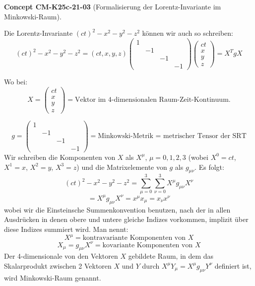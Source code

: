 \documentclass[10pt, letterpaper]{article}
\newcommand{\CustomHeading}[3]{%
  \par\medskip\noindent%
  \textbf{#1 #2} \textnormal{(#3)}.\enskip%
}
\newenvironment{CONC}[2]{\CustomHeading{Concept}{#1}{#2}}{}
\begin{document}
\begin{CONC}{CM-K25c-21-03}{Formalisierung der Lorentz-Invariante im Minkowski-Raum}
Die Lorentz-Invariante $(ct)^2-x^2-y^2-z^2$ können wir auch so schreiben:
\[(ct)^2-x^2-y^2-z^2 = (ct,x,y,z)\begin{pmatrix} 1 & & & \\ & -1 & & \\  & & -1 & \\ & & & -1 \end{pmatrix}\begin{pmatrix} ct \\ x \\ y \\ z\end{pmatrix} = X^T g X\]

Wo bei:
\[X = \begin{pmatrix} ct \\ x \\ y \\ z\end{pmatrix} = \text{Vektor im 4-dimensionalen Raum-Zeit-Kontinuum.}\]

\[g = \begin{pmatrix} 1 & & & \\ & -1 & & \\  & & -1 & \\ & & & -1 \end{pmatrix} = \text{Minkowski-Metrik = metrischer Tensor der SRT}\]
Wir schreiben die Komponenten von $X$ als $X^\mu$, $\mu=0,1,2,3$ (wobei $X^0=ct$, $X^1=x$, $X^2=y$, $X^3=z$) und die Matrixelemente von $g$ als $g_{\mu\nu}$. Es folgt:
\[(ct)^2-x^2-y^2-z^2 = \sum_{\mu=0}^3 \sum_{\nu=0}^3 X^\mu g_{\mu\nu} X^\nu\]
\[= X^\mu g_{\mu\nu} X^\nu = x^\mu x_\mu=x_\nu x^\nu\]
wobei wir die Einsteinsche Summenkonvention benutzen, nach der in allen Ausdrücken in denen obere und untere gleiche Indizes vorkommen, implizit über diese Indizes summiert wird.
Man nennt:
\[ X^\mu = \text{kontravariante Komponenten von } X \]
\[ X_\mu = g_{\mu\nu}X^\nu = \text{kovariante Komponenten von } X \]
Der 4-dimensionale von den Vektoren $X$ gebildete Raum, in dem das Skalarprodukt zwischen 2 Vektoren $X$ und $Y$ durch $X^\mu Y_\mu = X^\mu g_{\mu\nu}Y^\nu$ definiert ist, wird Minkowski-Raum genannt.
\end{CONC}
\end{document}
